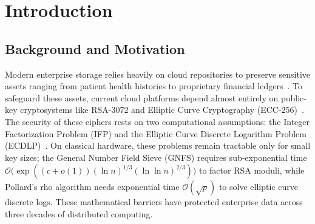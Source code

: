 \documentclass[pdflatex,sn-mathphys,Numbered]{sn-jnl}%
\theoremstyle{thmstyleone}%
\theoremstyle{thmstyletwo}%
\theoremstyle{thmstylethree}%
\begin{document}

\maketitle

\section{Introduction}\label{sec:intro}

\subsection{\textbf{Background and Motivation}}
Modern enterprise storage relies heavily on cloud repositories to preserve sensitive assets ranging from patient health histories to proprietary financial ledgers~\cite{mell2011nist}. To safeguard these assets, current cloud platforms depend almost entirely on public-key cryptosystems like RSA-3072 and Elliptic Curve Cryptography (ECC-256)~\cite{boneh2020graduate}. The security of these ciphers rests on two computational assumptions: the Integer Factorization Problem (IFP) and the Elliptic Curve Discrete Logarithm Problem (ECDLP)~\cite{katz2020introduction}. On classical hardware, these problems remain tractable only for small key sizes; the General Number Field Sieve (GNFS) requires sub-exponential time $\mathcal{O}\big(\exp((c + o(1)) (\ln n)^{1/3} (\ln \ln n)^{2/3})\big)$ to factor RSA moduli, while Pollard's rho algorithm needs exponential time $\mathcal{O}(\sqrt{p})$ to solve elliptic curve discrete logs. These mathematical barriers have protected enterprise data across three decades of distributed computing.
\end{document}
